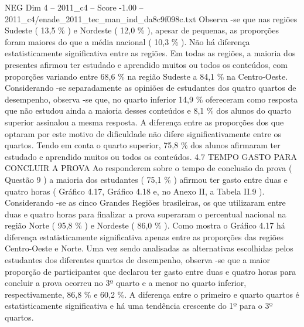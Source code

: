 \begin{textsample}{NEG Dim 4 – 2011\_c4 – Score -1.00 – 2011\_c4/enade\_2011\_tec\_man\_ind\_da8c9f098c.txt}
Observa -se que nas regiões Sudeste ( 13,5 \% ) e Nordeste ( 12,0 \% ), apesar de pequenas, as proporções foram maiores do que a média nacional ( 10,3 \% ).
Não há diferença estatisticamente significativa entre as regiões.
Em todas as regiões, a maioria dos presentes afirmou ter estudado e aprendido muitos ou todos os conteúdos, com proporções variando entre 68,6 \% na região Sudeste a 84,1 \% na Centro-Oeste.
Considerando -se separadamente as opiniões de estudantes dos quatro quartos de desempenho, observa -se que, no quarto inferior 14,9 \% ofereceram como resposta que não estudou ainda a maioria desses conteúdos e 8,1 \% dos alunos do quarto superior assinalou a mesma resposta.
A diferença entre as proporções dos que optaram por este motivo de dificuldade não difere significativamente entre os quartos.
Tendo em conta o quarto superior, 75,8 \% dos alunos afirmaram ter estudado e aprendido muitos ou todos os conteúdos. 4.7 TEMPO GASTO PARA CONCLUIR A PROVA Ao responderem sobre o tempo de conclusão da prova ( Questão 9 ) a maioria dos estudantes ( 75,1 \% ) afirmou ter gasto entre duas e quatro horas ( Gráfico 4.17, Gráfico 4.18 e, no Anexo II, a Tabela II.9 ).
Considerando -se as cinco Grandes Regiões brasileiras, os que utilizaram entre duas e quatro horas para finalizar a prova superaram o percentual nacional na região Norte ( 95,8 \% ) e Nordeste ( 86,0 \% ).
Como mostra o Gráfico 4.17 há diferença estatisticamente significativa apenas entre as proporções das regiões Centro-Oeste e Norte.
Uma vez sendo analisadas as alternativas escolhidas pelos estudantes dos diferentes quartos de desempenho, observa -se que a maior proporção de participantes que declarou ter gasto entre duas e quatro horas para concluir a prova ocorreu no 3º quarto e a menor no quarto inferior, respectivamente, 86,8 \% e 60,2 \%.
A diferença entre o primeiro e quarto quartos é estatisticamente significativa e há uma tendência crescente do 1º para o 3º quartos.

\end{textsample}
